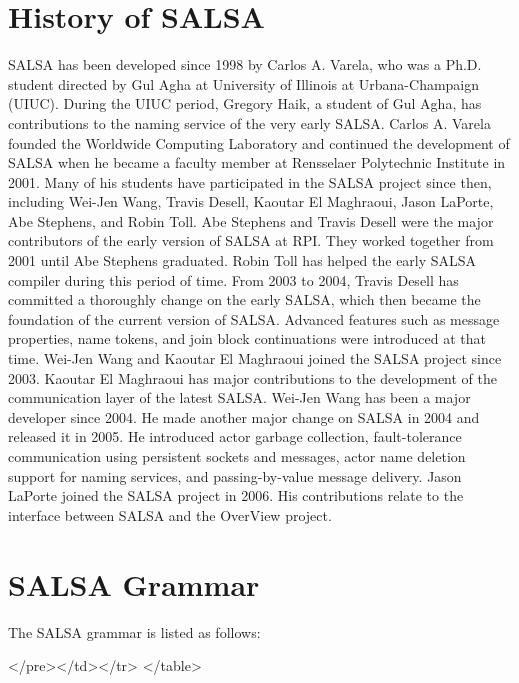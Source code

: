 \chapter{History of SALSA}
SALSA has been developed since 1998 by Carlos A. Varela, who was a Ph.D. student directed by Gul Agha at
University of Illinois at Urbana-Champaign (UIUC). During the UIUC period, Gregory Haik, a student of Gul Agha, 
has contributions to the naming service of the very early SALSA. 
Carlos A. Varela founded the Worldwide Computing Laboratory and continued the development of SALSA
when he became a faculty member at Rensselaer Polytechnic Institute in 2001.
Many of his students have participated in the SALSA project since then,
including Wei-Jen Wang,
Travis Desell, Kaoutar El Maghraoui, Jason LaPorte,
Abe Stephens, and Robin Toll.
Abe Stephens and Travis Desell were the major contributors of the early version of SALSA at RPI.
They worked together from 2001 until Abe Stephens graduated. Robin Toll has helped 
the early SALSA compiler during this period of time.
From 2003 to 2004, Travis Desell has committed a thoroughly change on the early SALSA, which then became the
foundation of the current version of SALSA. Advanced features such as message properties, 
name tokens, and join block continuations were introduced at that time. 
Wei-Jen Wang and Kaoutar El Maghraoui joined the SALSA project since 2003.
Kaoutar El Maghraoui has major contributions to the development of the communication layer of 
the latest SALSA.
Wei-Jen Wang has been a major developer since 2004. 
He made another major change on SALSA in 2004 and released it in 2005. 
He introduced actor garbage collection,
fault-tolerance communication using persistent sockets and messages, 
actor name deletion support for naming services, and passing-by-value message delivery.      
Jason LaPorte joined the SALSA project in 2006. His contributions relate to  
the interface between SALSA and the OverView project.   

\chapter{SALSA Grammar}\label{GRAMMAR}{
The SALSA grammar is listed as follows:
{\singlespace

}
\begin{htmlonly}

 \begin{rawhtml} 
   </pre></td></tr>
  </table>
\end{rawhtml} 
\end{htmlonly}

}
